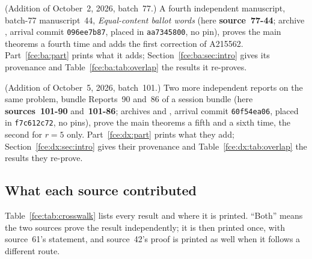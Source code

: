 \documentclass[11pt,a4paper]{article}
\numberwithin{equation}{section}
\theoremstyle{definition}\newtheorem{definition}[theorem]{Definition}
\theoremstyle{remark}\newtheorem{remark}[theorem]{Remark}
\begin{document}
(Addition of October~2, 2026, batch~77.) A fourth independent manuscript,
batch-77 manuscript~44, \emph{Equal-content ballot words} (here
\textbf{source~77-44}; archive ,
arrival commit \texttt{096ee7b87}, placed in \texttt{aa7345800}, no pin),
proves the main theorems a fourth time and adds the first correction of
A215562. Part~\ref{fce:ba:part} prints what it adds;
Section~\ref{fce:ba:sec:intro} gives its provenance and
Table~\ref{fce:ba:tab:overlap} the results it re-proves.

(Addition of October~5, 2026, batch~101.) Two more independent reports on the
same problem, bundle Reports~90 and~86 of a session bundle (here
\textbf{sources~101-90} and~\textbf{101-86}; archives
 and
, arrival commit
\texttt{60f54ea06}, placed in \texttt{f7c612c72}, no pins), prove the main
theorems a fifth and a sixth time, the second for $r=5$ only.
Part~\ref{fce:dx:part} prints what they add;
Section~\ref{fce:dx:sec:intro} gives their provenance and
Table~\ref{fce:dx:tab:overlap} the results they re-prove.

\subsection{What each source contributed}\label{fce:sec:crosswalk}
Table~\ref{fce:tab:crosswalk} lists every result and where it is printed.
``Both'' means the two sources prove the result independently; it is then
printed once, with source~61's statement, and source~42's proof is printed
as well when it follows a different route.
\end{document}
